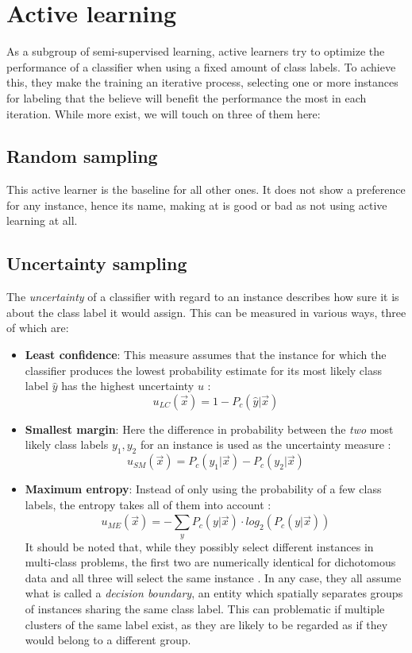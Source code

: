\section{Active learning}
\label{background:AL}
As a subgroup of semi-supervised learning, active learners try to optimize the performance of a classifier when using a fixed amount of class labels. To achieve this, they make the training an iterative process, selecting one or more instances for labeling that the believe will benefit the performance the most in each iteration. While more exist, we will touch on three of them here:

\subsection{Random sampling}
This active learner is the baseline for all other ones. It does not show a preference for any instance, hence its name, making at is good or bad as not using active learning at all.

\subsection{Uncertainty sampling}
The \textit{uncertainty} of a classifier with regard to an instance describes how sure it is about the class label it would assign. This can be measured in various ways, three of which are:

\begin{itemize}
\item \textbf{Least confidence}:
This measure assumes that the instance for which the classifier produces the lowest probability estimate for its most likely class label $\hat{y}$ has the highest uncertainty $u$ \cite{CulottaEtAl2004}:
\begin{equation}
u_{LC}(\vec{x}) = 1 - P_c(\hat{y} | \vec{x})
\end{equation}
\item \textbf{Smallest margin}:
Here the difference in probability between the \textit{two} most likely class labels $y_1, y_2$ for an instance is used as the uncertainty measure \cite{SchefferEtAl2001}:
\begin{equation}
u_{SM}(\vec{x}) = P_c(y_1 | \vec{x}) - P_c(y_2 | \vec{x})
\end{equation}
\item \textbf{Maximum entropy}:
Instead of only using the probability of a few class labels, the entropy takes all of them into account \cite{DaganEtAl1995}:
\begin{equation}
u_{ME}(\vec{x}) = -\sum_{y}^{} P_c(y | \vec{x}) \cdot log_2(P_c(y | \vec{x}))
\end{equation}
It should be noted that, while they possibly select different instances in multi-class problems, the first two are numerically identical for dichotomous data and all three will select the same instance \cite{ZhuEtAl2008}. In any case, they all assume what is called a \textit{decision boundary}, an entity which spatially separates groups of instances sharing the same class label. This can problematic if multiple clusters of the same label exist, as they are likely to be regarded as if they would belong to a different group.
\end{itemize}

